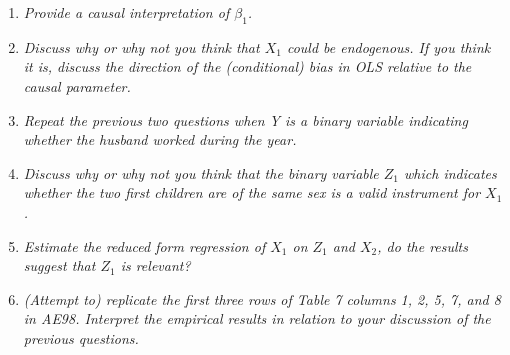 \documentclass[12pt,oneside,reqno]{amsart}
\begin{document}
\begin{enumerate}[label = (\roman*)]

\item \textit{Provide a causal interpretation of $\beta_1$.}


\item \textit{Discuss why or why not you think that $X_1$ could be endogenous. If you think it is, discuss the direction of the (conditional) bias in OLS relative to the causal parameter.}


\item \textit{Repeat the previous two questions when Y is a binary variable indicating whether the husband worked during the year.}


\item \textit{Discuss why or why not you think that the binary variable $Z_1$ which indicates whether the two first children are of the same sex is a valid instrument for $X_1$.}


\item \textit{Estimate the reduced form regression of $X_1$ on $Z_1$ and $X_2$, do the results suggest that $Z_1$ is relevant?}


\item \textit{(Attempt to) replicate the first three rows of Table 7 columns 1, 2, 5, 7, and 8 in AE98. Interpret the empirical results in relation to your discussion of the previous questions.}

\end{enumerate}
\end{document}
